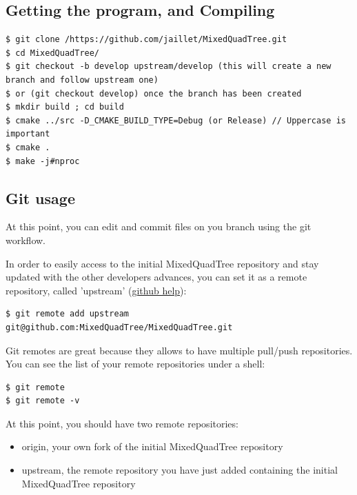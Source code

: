 \documentclass[10pt]{article}
\begin{document}
\subsection{Getting the program, and Compiling}

\begin{tcolorbox}{\small
\begin{verbatim}
$ git clone /https://github.com/jaillet/MixedQuadTree.git
$ cd MixedQuadTree/
$ git checkout -b develop upstream/develop (this will create a new branch and follow upstream one)
$ or (git checkout develop) once the branch has been created
$ mkdir build ; cd build
$ cmake ../src -D_CMAKE_BUILD_TYPE=Debug (or Release) // Uppercase is important
$ cmake .
$ make -j#nproc
\end{verbatim}
}\end{tcolorbox}

\subsection{Git usage}
At this point, you can edit and commit files on you branch using  the git workflow.

In order to easily access to the initial MixedQuadTree repository and stay updated with the other developers advances, you can set it as a remote repository, called 'upstream' (\href{https://help.github.com/articles/syncing-a-fork/}{github help}):


\begin{tcolorbox}
\begin{verbatim}
$ git remote add upstream git@github.com:MixedQuadTree/MixedQuadTree.git
\end{verbatim}
\end{tcolorbox}

Git remotes are great because they allows to have multiple pull/push repositories. You can see the list of your remote repositories under a shell:

\begin{tcolorbox}
\begin{verbatim}
$ git remote
$ git remote -v
\end{verbatim}
\end{tcolorbox}

At this point, you should have two remote repositories:
%
\begin{itemize}
\item origin, your own fork of the initial MixedQuadTree repository
\item upstream, the remote repository you have just added containing the initial MixedQuadTree repository
\end{itemize}
\end{document}
